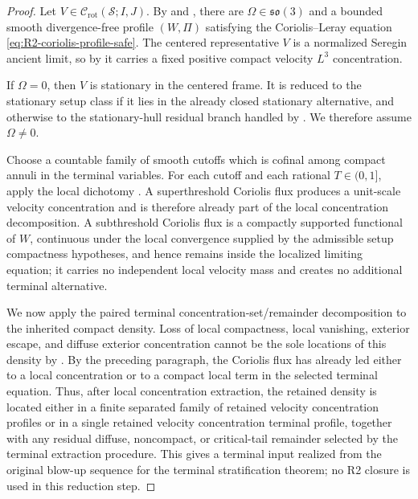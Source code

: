 \documentclass[11pt]{amsart}
\numberwithin{equation}{section}
\theoremstyle{plain}
\theoremstyle{definition}
\theoremstyle{remark}
\newcommand{\Crot}{\mathcal C_{\mathrm{rot}}}
\begin{document}
\begin{proof}
Let \(V\in\Crot(\mathcal S;I,J)\).  By
 and
, there are
\(\Omega\in\mathfrak{so}(3)\) and a bounded smooth divergence-free profile
\((W,\Pi)\) satisfying the Coriolis--Leray equation
\eqref{eq:R2-coriolis-profile-safe}.  The centered representative \(V\) is a
normalized Seregin ancient limit, so by
 it carries a fixed positive compact
velocity \(L^3\) concentration.

If \(\Omega=0\), then \(V\) is stationary in the centered frame.  It is reduced
to the stationary setup class if it lies in the already closed stationary
alternative, and otherwise to the stationary-hull residual branch handled by
.  We therefore assume
\(\Omega\ne0\).

Choose a countable family of smooth cutoffs which is cofinal among compact
annuli in the terminal variables.  For each cutoff and each rational
\(T\in(0,1]\), apply the local dichotomy
.  A superthreshold Coriolis flux produces
a unit-scale velocity concentration and is therefore already part of the local
concentration decomposition.  A subthreshold Coriolis flux is a compactly
supported functional
of \(W\), continuous under the local convergence supplied by the admissible setup
compactness hypotheses, and hence remains inside the localized limiting equation; it carries no
independent local velocity
mass and creates no additional terminal alternative.

We now apply the paired terminal concentration-set/remainder decomposition to the inherited compact
density.  Loss of local compactness, local vanishing, exterior escape, and
diffuse exterior concentration cannot be the sole locations of this density by
.  By the preceding paragraph, the
Coriolis flux has already led either to a local concentration or to a
compact local term in the selected terminal equation.  Thus, after local
concentration extraction, the retained density is located either in a finite separated family
of retained velocity concentration profiles or in a single retained velocity concentration
terminal profile, together with any residual diffuse, noncompact, or
critical-tail remainder selected by the terminal extraction procedure.
This gives a terminal input realized from the original blow-up sequence for the terminal stratification
theorem; no R2 closure is used in this reduction step.
\end{proof}
\end{document}
